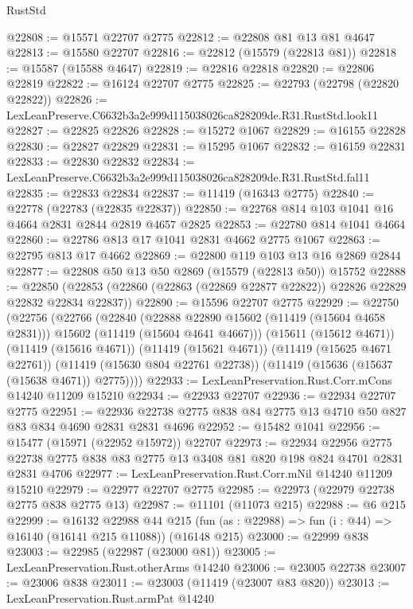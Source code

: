 \begin{lexlean}{RustStd}
\begin{coremodule}
@22808 := @15571 @22707 @2775
@22812 := @22808 @81 @13 @81 @4647
@22813 := @15580 @22707
@22816 := @22812 (@15579 (@22813 @81))
@22818 := @15587 (@15588 @4647)
@22819 := @22816 @22818
@22820 := @22806 @22819
@22822 := @16124 @22707 @2775
@22825 := @22793 (@22798 (@22820 @22822))
@22826 := LexLeanPreserve.C6632b3a2e999d115038026ca828209de.R31.RustStd.look11
@22827 := @22825 @22826
@22828 := @15272 @1067
@22829 := @16155 @22828
@22830 := @22827 @22829
@22831 := @15295 @1067
@22832 := @16159 @22831
@22833 := @22830 @22832
@22834 := LexLeanPreserve.C6632b3a2e999d115038026ca828209de.R31.RustStd.fal11
@22835 := @22833 @22834
@22837 := @11419 (@16343 @2775)
@22840 := @22778 (@22783 (@22835 @22837))
@22850 := @22768 @814 @103 @1041 @16 @4664 @2831 @2844 @2819 @4657 @2825
@22853 := @22780 @814 @1041 @4664
@22860 := @22786 @813 @17 @1041 @2831 @4662 @2775 @1067
@22863 := @22795 @813 @17 @4662
@22869 := @22800 @119 @103 @13 @16 @2869 @2844
@22877 := @22808 @50 @13 @50 @2869 (@15579 (@22813 @50)) @15752
@22888 := @22850
    (@22853 (@22860 (@22863 (@22869 @22877 @22822)) @22826 @22829 @22832 @22834 @22837))
@22890 := @15596 @22707 @2775
@22929 := @22750
    (@22756
      (@22766
        (@22840
          (@22888 @22890 @15602 (@11419 (@15604 @4658 @2831)))
          @15602
          (@11419 (@15604 @4641 @4667)))
        (@15611 (@15612 @4671))
        (@11419 (@15616 @4671))
        (@11419 (@15621 @4671))
        (@11419 (@15625 @4671 @22761))
        (@11419 (@15630 @804 @22761 @22738))
        (@11419 (@15636 (@15637 (@15638 @4671)) @2775))))
@22933 := LexLeanPreservation.Rust.Corr.mCons @14240 @11209 @15210
@22934 := @22933 @22707
@22936 := @22934 @22707 @2775
@22951 := @22936 @22738 @2775 @838 @84 @2775 @13 @4710 @50 @827 @83 @834 @4690 @2831 @2831 @4696
@22952 := @15482 @1041
@22956 := @15477 (@15971 (@22952 @15972)) @22707
@22973 := @22934
    @22956
    @2775
    @22738
    @2775
    @838
    @83
    @2775
    @13
    @3408
    @81
    @820
    @198
    @824
    @4701
    @2831
    @2831
    @4706
@22977 := LexLeanPreservation.Rust.Corr.mNil @14240 @11209 @15210
@22979 := @22977 @22707 @2775
@22985 := @22973 (@22979 @22738 @2775 @838 @2775 @13)
@22987 := @11101 (@11073 @215)
@22988 := @6 @215
@22999 := @16132
    @22988
    @44
    @215
    (fun (as : @22988) => fun (i : @44) => @16140 (@16141 @215 @11088))
    (@16148 @215)
@23000 := @22999 @838
@23003 := @22985 (@22987 (@23000 @81))
@23005 := LexLeanPreservation.Rust.otherArms @14240
@23006 := @23005 @22738
@23007 := @23006 @838
@23011 := @23003 (@11419 (@23007 @83 @820))
@23013 := LexLeanPreservation.Rust.armPat @14240

\end{coremodule}
\end{lexlean}
